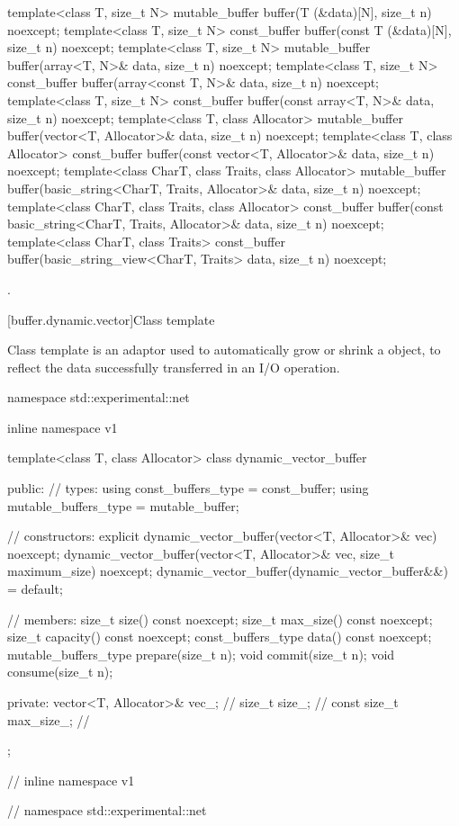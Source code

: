 \begin{itemdecl}
template<class T, size_t N>
  mutable_buffer buffer(T (&data)[N], size_t n) noexcept;
template<class T, size_t N>
  const_buffer buffer(const T (&data)[N], size_t n) noexcept;
template<class T, size_t N>
  mutable_buffer buffer(array<T, N>& data, size_t n) noexcept;
template<class T, size_t N>
  const_buffer buffer(array<const T, N>& data, size_t n) noexcept;
template<class T, size_t N>
  const_buffer buffer(const array<T, N>& data, size_t n) noexcept;
template<class T, class Allocator>
  mutable_buffer buffer(vector<T, Allocator>& data, size_t n) noexcept;
template<class T, class Allocator>
  const_buffer buffer(const vector<T, Allocator>& data, size_t n) noexcept;
template<class CharT, class Traits, class Allocator>
  mutable_buffer buffer(basic_string<CharT, Traits, Allocator>& data,
                        size_t n) noexcept;
template<class CharT, class Traits, class Allocator>
  const_buffer buffer(const basic_string<CharT, Traits, Allocator>& data,
                      size_t n) noexcept;
template<class CharT, class Traits>
  const_buffer buffer(basic_string_view<CharT, Traits> data,
                      size_t n) noexcept;
\end{itemdecl}

\begin{itemdescr}
\pnum
\returns {}.
\end{itemdescr}



[buffer.dynamic.vector]{Class template }

%
\pnum
Class template  is an adaptor used to automatically grow or shrink a  object, to reflect the data successfully transferred in an I/O operation.

\begin{codeblock}
namespace std::experimental::net {
inline namespace v1 {

  template<class T, class Allocator>
  class dynamic_vector_buffer
  {
  public:
    // types:
    using const_buffers_type = const_buffer;
    using mutable_buffers_type = mutable_buffer;

    // constructors:
    explicit dynamic_vector_buffer(vector<T, Allocator>& vec) noexcept;
    dynamic_vector_buffer(vector<T, Allocator>& vec,
                          size_t maximum_size) noexcept;
    dynamic_vector_buffer(dynamic_vector_buffer&&) = default;

    // members:
    size_t size() const noexcept;
    size_t max_size() const noexcept;
    size_t capacity() const noexcept;
    const_buffers_type data() const noexcept;
    mutable_buffers_type prepare(size_t n);
    void commit(size_t n);
    void consume(size_t n);

  private:
    vector<T, Allocator>& vec_; // \expos
    size_t size_; // \expos
    const size_t max_size_; // \expos
  };

} // inline namespace v1
} // namespace std::experimental::net
\end{codeblock}

